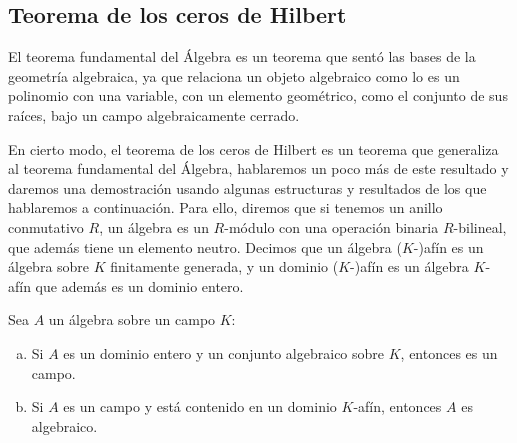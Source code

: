 \subsection{Teorema de los ceros de Hilbert}

El teorema fundamental del Álgebra es un teorema que sentó las bases de la geometría algebraica, ya que relaciona un objeto algebraico como lo es un polinomio con una variable, con un elemento geométrico, como el conjunto de sus raíces, bajo un campo algebraicamente cerrado.

En cierto modo, el teorema de los ceros de Hilbert es un teorema que generaliza al teorema fundamental del Álgebra, hablaremos un poco más de este resultado y daremos una demostración usando algunas estructuras y resultados de los que hablaremos a continuación. Para ello, diremos que si tenemos un anillo conmutativo $R$, un álgebra es un $R$-módulo con una operación binaria $R$-bilineal, que además tiene un elemento neutro. Decimos que un álgebra ($K$-)afín es un álgebra sobre $K$ finitamente generada, y un dominio ($K$-)afín es un álgebra $K$-afín que además es un dominio entero.

\begin{lemma}
Sea $A$ un álgebra sobre un campo $K$:
\begin{enumerate} [(a)]
\item Si $A$ es un dominio entero y un conjunto algebraico sobre $K$, entonces es un campo.
\item Si $A$ es un campo y está contenido en un dominio $K$-afín, entonces $A$ es algebraico.
\end{enumerate}
\end{lemma}

